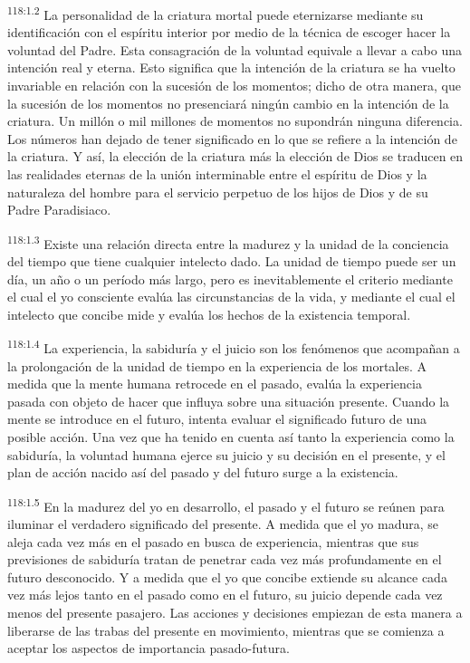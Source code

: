 \par
\textsuperscript{118:1.2} La personalidad de la criatura mortal puede eternizarse mediante su identificación con el espíritu interior por medio de la técnica de escoger hacer la voluntad del Padre. Esta consagración de la voluntad equivale a llevar a cabo una intención real y eterna. Esto significa que la intención de la criatura se ha vuelto invariable en relación con la sucesión de los momentos; dicho de otra manera, que la sucesión de los momentos no presenciará ningún cambio en la intención de la criatura. Un millón o mil millones de momentos no supondrán ninguna diferencia. Los números han dejado de tener significado en lo que se refiere a la intención de la criatura. Y así, la elección de la criatura más la elección de Dios se traducen en las realidades eternas de la unión interminable entre el espíritu de Dios y la naturaleza del hombre para el servicio perpetuo de los hijos de Dios y de su Padre Paradisiaco.

\par
\textsuperscript{118:1.3} Existe una relación directa entre la madurez y la unidad de la conciencia del tiempo que tiene cualquier intelecto dado. La unidad de tiempo puede ser un día, un año o un período más largo, pero es inevitablemente el criterio mediante el cual el yo consciente evalúa las circunstancias de la vida, y mediante el cual el intelecto que concibe mide y evalúa los hechos de la existencia temporal.

\par
\textsuperscript{118:1.4} La experiencia, la sabiduría y el juicio son los fenómenos que acompañan a la prolongación de la unidad de tiempo en la experiencia de los mortales. A medida que la mente humana retrocede en el pasado, evalúa la experiencia pasada con objeto de hacer que influya sobre una situación presente. Cuando la mente se introduce en el futuro, intenta evaluar el significado futuro de una posible acción. Una vez que ha tenido en cuenta así tanto la experiencia como la sabiduría, la voluntad humana ejerce su juicio y su decisión en el presente, y el plan de acción nacido así del pasado y del futuro surge a la existencia.

\par
\textsuperscript{118:1.5} En la madurez del yo en desarrollo, el pasado y el futuro se reúnen para iluminar el verdadero significado del presente. A medida que el yo madura, se aleja cada vez más en el pasado en busca de experiencia, mientras que sus previsiones de sabiduría tratan de penetrar cada vez más profundamente en el futuro desconocido. Y a medida que el yo que concibe extiende su alcance cada vez más lejos tanto en el pasado como en el futuro, su juicio depende cada vez menos del presente pasajero. Las acciones y decisiones empiezan de esta manera a liberarse de las trabas del presente en movimiento, mientras que se comienza a aceptar los aspectos de importancia pasado-futura.

